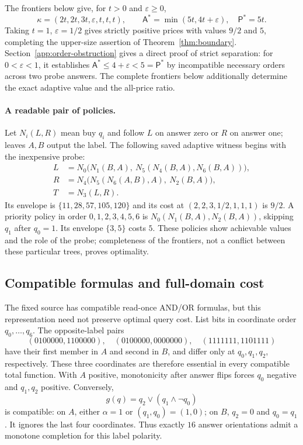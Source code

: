 \documentclass[pdflatex,sn-mathphys-num]{sn-jnl}
\newcommand{\A}{\mathsf{A}}
\newcommand{\Pcost}{\mathsf{P}}
\theoremstyle{thmstyleone}
\theoremstyle{thmstylethree}
\theoremstyle{thmstyletwo}
\begin{document}
The frontiers below give, for $t>0$ and $\varepsilon\geq0$,
\[
 \kappa=(2t,2t,3t,\varepsilon,t,t,t),\qquad
 \A^*=\min(5t,4t+\varepsilon),\quad\Pcost^*=5t.
\]
Taking $t=1$, $\varepsilon=1/2$ gives strictly positive prices with values $9/2$ and $5$, completing the upper-size assertion of Theorem~\ref{thm:boundary}. Section~\ref{app:order-obstruction} gives a direct proof of strict separation: for $0<\varepsilon<1$, it establishes $\A^*\leq4+\varepsilon<5=\Pcost^*$ by incompatible necessary orders across two probe answers. The complete frontiers below additionally determine the exact adaptive value and the all-price ratio.

\paragraph*{A readable pair of policies.}
Let $N_i(L,R)$ mean buy $q_i$ and follow $L$ on answer zero or $R$ on answer one; leaves $A,B$ output the label. The following saved adaptive witness begins with the inexpensive probe:
\begin{align*}
 L&=N_0\bigl(N_1(B,A),\ N_5(N_4(B,A),N_6(B,A))\bigr),\\
 R&=N_4\bigl(N_5(N_6(A,B),A),\ N_2(B,A)\bigr),\\
 T&=N_3(L,R).
\end{align*}
Its envelope is $\{11,28,57,105,120\}$ and its cost at $(2,2,3,1/2,1,1,1)$ is $9/2$. A priority policy in order $0,1,2,3,4,5,6$ is $N_0(N_1(B,A),N_2(B,A))$, skipping $q_1$ after $q_0=1$. Its envelope $\{3,5\}$ costs $5$. These policies show achievable values and the role of the probe; completeness of the frontiers, not a conflict between these particular trees, proves optimality.

\subsection{Compatible formulas and full-domain cost}\label{sec:ro-completion}
The fixed source has compatible read-once AND/OR formulas, but this representation need not preserve optimal query cost. List bits in coordinate order $q_0,\ldots,q_6$. The opposite-label pairs
\[
 (0100000,1100000),\quad(0100000,0000000),\quad
 (1111111,1101111)
\]
have their first member in $A$ and second in $B$, and differ only at $q_0,q_1,q_2$, respectively. These three coordinates are therefore essential in every compatible total function. With $A$ positive, monotonicity after answer flips forces $q_0$ negative and $q_1,q_2$ positive. Conversely,
\[
 g(q)=q_2\lor(q_1\land\neg q_0)
\]
is compatible: on $A$, either $\alpha=1$ or $(q_1,q_0)=(1,0)$; on $B$, $q_2=0$ and $q_0=q_1$. It ignores the last four coordinates. Thus exactly $16$ answer orientations admit a monotone completion for this label polarity.
\end{document}

